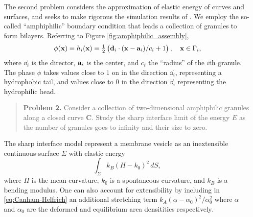 The second problem considers the approximation
of elastic energy of curves and surfaces,
and seeks to make rigorous the simulation results of
\cite{FuQuRyYo22, Fu2018_SIAM}.
We employ the so-called ``amphiphilic'' boundary condition
that leads a collection of granules to form bilayers.
Referring to Figure \ref{fig:amphiphilic_assembly}, 
\begin{equation}
\label{eq:amphiphilic_BC}
\phi(\mathbf{x}) = h_i(\mathbf{x}) = \tfrac{1}{2}\left(\dd_i \cdot (\xx - \aa_i)/c_i + 1\right), \quad
\mathbf{x} \in \Gamma_i,
\end{equation}
where $\dd_i$ is the director, $\aa_i$ is the center, and $c_i$ the
``radius'' of the $i$th granule.  
The phase $\phi$ takes values close to $1$ on in the direction $\dd_i$,
representing a hydrophobic tail, and values close to $0$ 
in the direction $\dd_i$ representing the hydrophilic head.

\begin{quotation}
  \textbf{Problem 2.}
  Consider a collection of two-dimensional
  amphiphilic granules along a closed curve $\mathbf{C}$. 
  Study the sharp interface limit of the energy $E$ 
  as the number of granules goes to infinity and their size to zero.
\end{quotation}
The sharp interface model
represent a membrane vesicle as an
inextensible continuous surface $\Sigma$ with elastic energy
\begin{equation}
\label{eq:Canham-Helfrich}
  \int_{\Sigma} k_B(H - k_0)^2\, dS,
\end{equation}
where $H$ is the mean curvature, $k_0$ is a spontaneous curvature,
and $k_B$ is a bending modulus.
One can also account for extensibility
by including in 
\eqref{eq:Canham-Helfrich} an additional stretching term
$k_A(\alpha - \alpha_0)^2/\alpha_0^2$ where $\alpha$ and $\alpha_0$ are the deformed and equilibrium area densitities respectively. 

